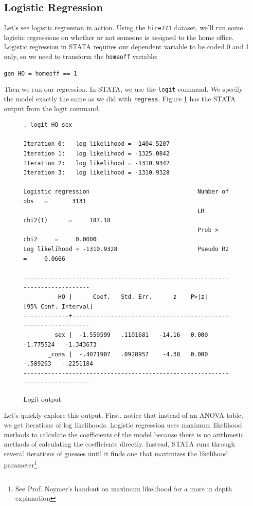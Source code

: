 \documentclass[12pt]{amsart}
\begin{document}
\subsection{Logistic Regression}

Let's see logistic regression in action. Using the \texttt{hire771} dataset, we'll run some logistic regressions on whether or not someone is assigned to the home office. Logistic regression in STATA requires our dependent variable to be coded 0 and 1 only, so we need to transform the \texttt{homeoff} variable:

\texttt{gen HO = homeoff == 1}

Then we run our regression. In STATA, we use the \texttt{logit} command. We specify the model exactly the same as we did with \texttt{regress}. Figure \ref{fig:two} has the STATA output from the logit command.

\begin{figure}[htb]
\caption{Logit output\label{fig:two}}
\begin{verbatim}
. logit HO sex

Iteration 0:   log likelihood = -1404.5207
Iteration 1:   log likelihood = -1325.0842
Iteration 2:   log likelihood = -1310.9342
Iteration 3:   log likelihood = -1310.9328

Logistic regression                               Number of obs   =       3131
                                                  LR chi2(1)      =     187.18
                                                  Prob > chi2     =     0.0000
Log likelihood = -1310.9328                       Pseudo R2       =     0.0666

------------------------------------------------------------------------------
          HO |      Coef.   Std. Err.      z    P>|z|     [95% Conf. Interval]
-------------+----------------------------------------------------------------
         sex |  -1.559599   .1101681   -14.16   0.000    -1.775524   -1.343673
       _cons |  -.4071907   .0928957    -4.38   0.000     -.589263   -.2251184
------------------------------------------------------------------------------
\end{verbatim}
\end{figure}

Let's quickly explore this output. First, notice that instead of an ANOVA table, we get iterations of log likelihoods. Logistic regression uses maximum likelihood methods to calculate the coefficients of the model because there is no arithmetic methods of calculating the coefficients directly. Instead, STATA runs through several iterations of guesses until it finds one that maximizes the likelihood parameter\footnote{See Prof. Noymer's handout on maximum likelihood for a more in depth explanation}. 
\end{document}
